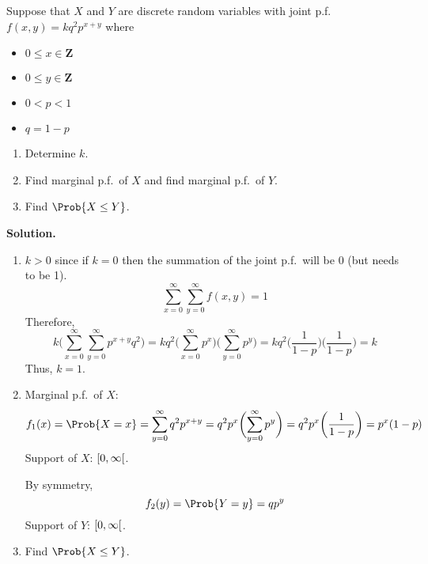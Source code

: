 \begin{Example}{}{}
    Suppose that $ X $ and $ Y $ are discrete random variables
    with joint p.f.\ $ f(x,y)=kq^2 p^{x+y} $ where
    \begin{itemize}
        \item $ 0\le x\in\mathbf{Z}$
        \item $ 0\le y\in\mathbf{Z} $
        \item $ 0<p<1 $
        \item $ q=1-p $
    \end{itemize}
    \begin{enumerate}[label=(\roman*)]
        \item Determine $ k $.
        \item Find marginal p.f.\ of $ X $ and
              find marginal p.f.\ of $ Y $.
        \item Find $ \Prob{X\le Y} $.
    \end{enumerate}
    \textbf{Solution.}
    \begin{enumerate}[label=(\roman*)]
        \item $ k>0 $ since if $ k=0 $ then the summation
              of the joint p.f.\ will be 0 (but needs to be 1).
              \[\sum\limits_{x=0}^{\infty}
                  \sum\limits_{y=0}^{\infty} f(x,y)=1\]
              Therefore,
              \[k\biggl(\sum\limits_{x=0}^{\infty}
                  \sum\limits_{y=0}^{\infty} p^{x+y}q^2\biggr)=
                  kq^2\biggl(\sum\limits_{x=0}^{\infty} p^x\biggr)
                  \biggl(\sum\limits_{y=0}^{\infty}p^y\biggr)=kq^2
                  \biggl( \frac{1}{1-p}  \biggr)\biggr( \frac{1}{1-p} \biggr)=k
              \]
              Thus, $ k=1 $.
        \item Marginal p.f.\ of $ X $:
              \[ f_1(x)=\Prob{X=x}=
                  \sum\limits_{y=0}^{\infty} q^2p^{x+y}=
                  q^2 p^x
                  \biggl(\sum\limits_{y=0}^{\infty} p^y \biggr)
                  =q^2 p^x \biggl( \frac{1}{1-p}  \biggr)=p^x(1-p) \]
              Support of $ X $: $ \interval[open right]{0}{\infty} $.

              By symmetry,
              \[ f_2(y)=\Prob{Y=y}=qp^y \]
              Support of $ Y $: $ \interval[open right]{0}{\infty} $.
        \item Find $ \Prob{X\le Y} $.


\end{enumerate}
\end{Example}
